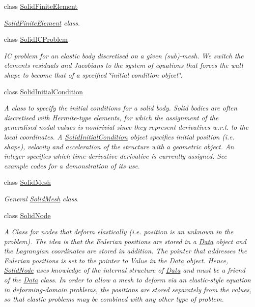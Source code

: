\begin{DoxyCompactItemize}
\item 
class \hyperlink{classoomph_1_1SolidFiniteElement}{Solid\+Finite\+Element}
\begin{DoxyCompactList}\small\item\em \hyperlink{classoomph_1_1SolidFiniteElement}{Solid\+Finite\+Element} class. \end{DoxyCompactList}\item 
class \hyperlink{classoomph_1_1SolidICProblem}{Solid\+I\+C\+Problem}
\begin{DoxyCompactList}\small\item\em IC problem for an elastic body discretised on a given (sub)-\/mesh. We switch the elements\textquotesingle{} residuals and Jacobians to the system of equations that forces the wall shape to become that of a specified \char`\"{}initial condition object\char`\"{}. \end{DoxyCompactList}\item 
class \hyperlink{classoomph_1_1SolidInitialCondition}{Solid\+Initial\+Condition}
\begin{DoxyCompactList}\small\item\em A class to specify the initial conditions for a solid body. Solid bodies are often discretised with Hermite-\/type elements, for which the assignment of the generalised nodal values is nontrivial since they represent derivatives w.\+r.\+t. to the local coordinates. A \hyperlink{classoomph_1_1SolidInitialCondition}{Solid\+Initial\+Condition} object specifies initial position (i.\+e. shape), velocity and acceleration of the structure with a geometric object. An integer specifies which time-\/derivative derivative is currently assigned. See example codes for a demonstration of its use. \end{DoxyCompactList}\item 
class \hyperlink{classoomph_1_1SolidMesh}{Solid\+Mesh}
\begin{DoxyCompactList}\small\item\em General \hyperlink{classoomph_1_1SolidMesh}{Solid\+Mesh} class. \end{DoxyCompactList}\item 
class \hyperlink{classoomph_1_1SolidNode}{Solid\+Node}
\begin{DoxyCompactList}\small\item\em A Class for nodes that deform elastically (i.\+e. position is an unknown in the problem). The idea is that the Eulerian positions are stored in a \hyperlink{classoomph_1_1Data}{Data} object and the Lagrangian coordinates are stored in addition. The pointer that addresses the Eulerian positions is set to the pointer to Value in the \hyperlink{classoomph_1_1Data}{Data} object. Hence, \hyperlink{classoomph_1_1SolidNode}{Solid\+Node} uses knowledge of the internal structure of \hyperlink{classoomph_1_1Data}{Data} and must be a friend of the \hyperlink{classoomph_1_1Data}{Data} class. In order to allow a mesh to deform via an elastic-\/style equation in deforming-\/domain problems, the positions are stored separately from the values, so that elastic problems may be combined with any other type of problem. \end{DoxyCompactList}\item 

\end{DoxyCompactItemize}
